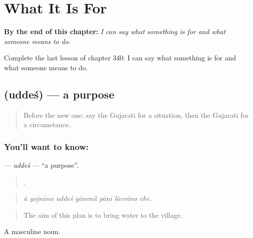 
\chapter{What It Is For}
\label{ch:gu-what-it-is-for}

\begin{chapteropening}
\textbf{By the end of this chapter:} \emph{I can say what something is for and what someone means to do.}

Complete the last lesson of chapter 340: I can say what something is for and what someone means to do.
\end{chapteropening}

\section[\texorpdfstring{\gu{ઉદ્દેશ} (uddeś)}{ઉદ્દેશ (uddeś)}]{ (uddeś) — a purpose}

\label{lesson:GU-C340-uddes}



\begin{quote}
Before the new one: say the Gujarati for a situation, then the Gujarati for a circumstance.
\end{quote}

\subsection*{You'll want to know: }
\textbf{} — \emph{uddeś} — \textquotedblleft{}a purpose\textquotedblright{}.

\begin{quote}
      .
\end{quote}

\begin{quote}
\emph{ā yojnāno uddeś gāmmā̃ pāṇī lāvvāno che.}
\end{quote}

\begin{quote}
The aim of this plan is to bring water to the village.
\end{quote}

A masculine noun.

